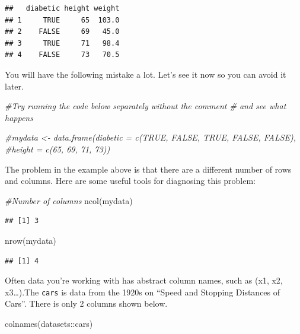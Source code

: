 \documentclass[
]{book}
\newenvironment{Shaded}{\begin{snugshade}}{\end{snugshade}}
\newcommand{\CommentTok}[1]{\textcolor[rgb]{0.56,0.35,0.01}{\textit{#1}}}
\newcommand{\FunctionTok}[1]{\textcolor[rgb]{0.00,0.00,0.00}{#1}}
\newcommand{\NormalTok}[1]{#1}
\newcommand{\SpecialCharTok}[1]{\textcolor[rgb]{0.00,0.00,0.00}{#1}}
\begin{document}
\begin{verbatim}
##   diabetic height weight
## 1     TRUE     65  103.0
## 2    FALSE     69   45.0
## 3     TRUE     71   98.4
## 4    FALSE     73   70.5
\end{verbatim}

You will have the following mistake a lot. Let's see it now so you can avoid it later.

\begin{Shaded}
\begin{Highlighting}[]
\CommentTok{\#Try running the code below separately without the comment \# and see what happens}

\CommentTok{\#mydata \textless{}{-} data.frame(diabetic = c(TRUE, FALSE, TRUE, FALSE, FALSE), }
                     \CommentTok{\#height = c(65, 69, 71, 73))}
\end{Highlighting}
\end{Shaded}

The problem in the example above is that there are a different number of rows and columns. Here are some useful tools for diagnosing this problem:

\begin{Shaded}
\begin{Highlighting}[]
\CommentTok{\#Number of columns}
\FunctionTok{ncol}\NormalTok{(mydata)}
\end{Highlighting}
\end{Shaded}

\begin{verbatim}
## [1] 3
\end{verbatim}

\begin{Shaded}
\begin{Highlighting}[]
\FunctionTok{nrow}\NormalTok{(mydata)}
\end{Highlighting}
\end{Shaded}

\begin{verbatim}
## [1] 4
\end{verbatim}

Often data you're working with has abstract column names, such as (x1, x2, x3\ldots).The \texttt{cars} is data from the 1920s on ``Speed and Stopping Distances of Cars''. There is only 2 columns shown below.

\begin{Shaded}
\begin{Highlighting}[]
\FunctionTok{colnames}\NormalTok{(datasets}\SpecialCharTok{::}\NormalTok{cars)}
\end{Highlighting}
\end{Shaded}
\end{document}

